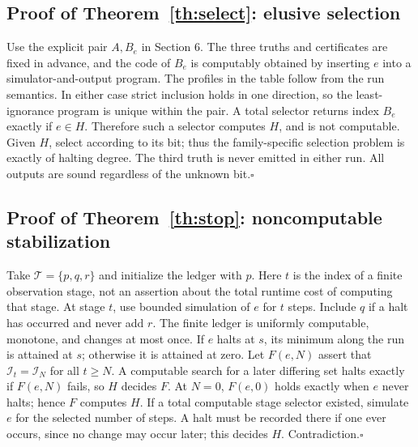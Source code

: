 \documentclass[11pt]{article}
\newcommand{\T}{\mathcal T}\newcommand{\K}{\mathcal K}\newcommand{\I}{\mathcal I}\newcommand{\A}{\mathcal A}
\begin{document}
\subsection{Proof of Theorem~\ref{th:select}: elusive selection}
Use the explicit pair $A,B_e$ in Section 6. The three truths and certificates are fixed in advance, and the code of $B_e$ is computably obtained by inserting $e$ into a simulator-and-output program. The profiles in the table follow from the run semantics. In either case strict inclusion holds in one direction, so the least-ignorance program is unique within the pair. A total selector returns index $B_e$ exactly if $e\in H$. Therefore such a selector computes $H$, and is not computable. Given $H$, select according to its bit; thus the family-specific selection problem is exactly of halting degree. The third truth is never emitted in either run. All outputs are sound regardless of the unknown bit.\hfill$\square$

\subsection{Proof of Theorem~\ref{th:stop}: noncomputable stabilization}
Take $\T=\{p,q,r\}$ and initialize the ledger with $p$. Here $t$ is the index of a finite observation stage, not an assertion about the total runtime cost of computing that stage. At stage $t$, use bounded simulation of $e$ for $t$ steps. Include $q$ if a halt has occurred and never add $r$. The finite ledger is uniformly computable, monotone, and changes at most once. If $e$ halts at $s$, its minimum along the run is attained at $s$; otherwise it is attained at zero. Let $F(e,N)$ assert that $\I_t=\I_N$ for all $t\ge N$. A computable search for a later differing set halts exactly if $F(e,N)$ fails, so $H$ decides $F$. At $N=0$, $F(e,0)$ holds exactly when $e$ never halts; hence $F$ computes $H$. If a total computable stage selector existed, simulate $e$ for the selected number of steps. A halt must be recorded there if one ever occurs, since no change may occur later; this decides $H$. Contradiction.\hfill$\square$
\end{document}
